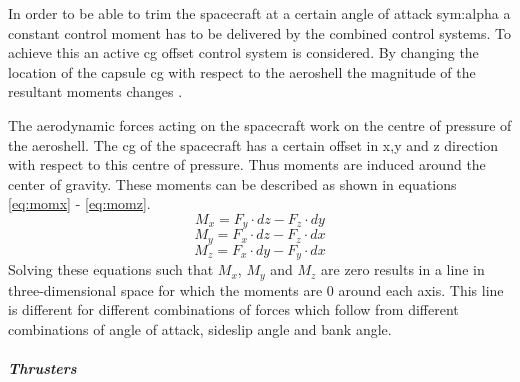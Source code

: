 In order to be able to trim the spacecraft at a certain angle of attack \gls{sym:alpha} a constant control moment has to be delivered by the combined control systems. To achieve this an active \gls{cg} offset control system is considered. By changing the location of the capsule \gls{cg} with respect to the aeroshell the magnitude of the resultant moments changes \cite{Mulqueen1991}. 

The aerodynamic forces acting on the spacecraft work on the centre of pressure of the aeroshell. The \gls{cg} of the spacecraft has a certain offset in x,y and z direction with respect to this centre of pressure. Thus moments are induced around the center of gravity. These moments can be described as shown in equations \ref{eq:momx} - \ref{eq:momz}.
\begin{equation}
\label{eq:momx}
M_x = F_y \cdot dz - F_z \cdot dy
\end{equation}
\begin{equation}
\label{eq:momy}
M_y = F_x \cdot dz - F_z \cdot dx
\end{equation}
\begin{equation}
\label{eq:momz}
M_z = F_x \cdot dy - F_y \cdot dx
\end{equation}
Solving these equations such that $M_{x}$, $M_{y}$ and $M_{z}$ are zero results in a line in three-dimensional space for which the moments are 0 around each axis. This line is different for different combinations of forces which follow from different combinations of angle of attack, sideslip angle and bank angle.

\subparagraph{Thrusters}
\label{subpar:thrusters}

